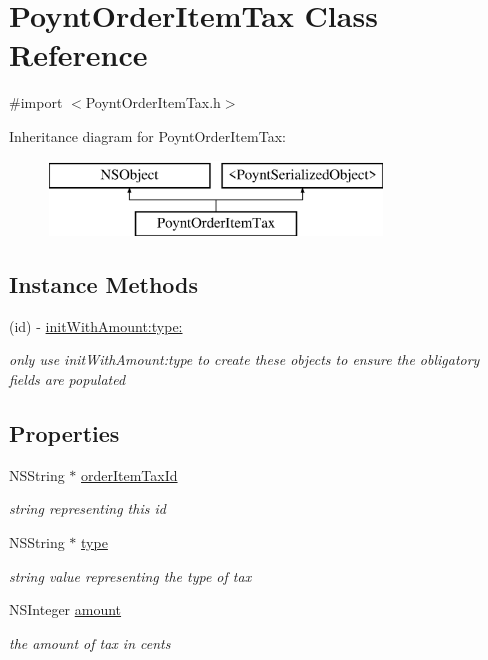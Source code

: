 \hypertarget{interface_poynt_order_item_tax}{}\section{Poynt\+Order\+Item\+Tax Class Reference}
\label{interface_poynt_order_item_tax}


{\ttfamily \#import $<$Poynt\+Order\+Item\+Tax.\+h$>$}

Inheritance diagram for Poynt\+Order\+Item\+Tax\+:\begin{figure}[H]
\begin{center}
\leavevmode
\includegraphics[height=2.000000cm]{interface_poynt_order_item_tax}
\end{center}
\end{figure}
\subsection*{Instance Methods}
\begin{DoxyCompactItemize}
\item 
(id) -\/ \hyperlink{interface_poynt_order_item_tax_a64b4adba02da4a202dd84d072ce7f644}{init\+With\+Amount\+:type\+:}
\begin{DoxyCompactList}\small\item\em only use init\+With\+Amount\+:type to create these objects to ensure the obligatory fields are populated \end{DoxyCompactList}\end{DoxyCompactItemize}
\subsection*{Properties}
\begin{DoxyCompactItemize}
\item 
N\+S\+String $\ast$ \hyperlink{interface_poynt_order_item_tax_a342356fc9b7bcfd0250df7e71bc2360e}{order\+Item\+Tax\+Id}
\begin{DoxyCompactList}\small\item\em string representing this id \end{DoxyCompactList}\item 
N\+S\+String $\ast$ \hyperlink{interface_poynt_order_item_tax_abff6a04d71c2bba87e646615388a1f5c}{type}
\begin{DoxyCompactList}\small\item\em string value representing the type of tax \end{DoxyCompactList}\item 
N\+S\+Integer \hyperlink{interface_poynt_order_item_tax_a6ff5079a7aa518c578773da69959732d}{amount}
\begin{DoxyCompactList}\small\item\em the amount of tax in cents \end{DoxyCompactList}\end{DoxyCompactItemize}


